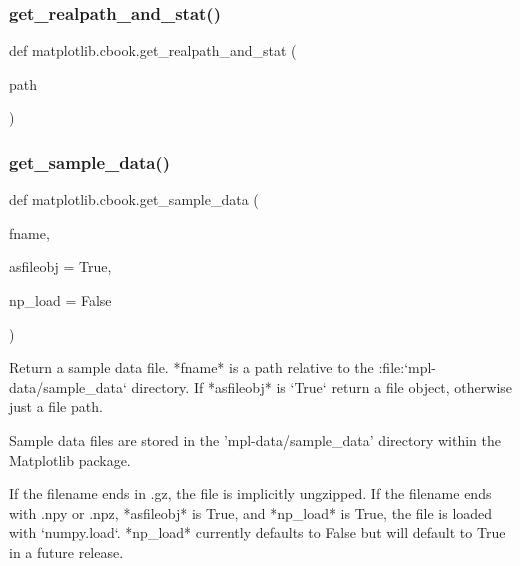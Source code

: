 \subsubsection{\texorpdfstring{get\+\_\+realpath\+\_\+and\+\_\+stat()}{get\_realpath\_and\_stat()}}
{\footnotesize\ttfamily def matplotlib.\+cbook.\+get\+\_\+realpath\+\_\+and\+\_\+stat (\begin{DoxyParamCaption}\item[{}]{path }\end{DoxyParamCaption})}

\mbox{\label{namespacematplotlib_1_1cbook_a846b3b7e13d95cc8f596a8bbe7b62029}} 
\subsubsection{\texorpdfstring{get\+\_\+sample\+\_\+data()}{get\_sample\_data()}}
{\footnotesize\ttfamily def matplotlib.\+cbook.\+get\+\_\+sample\+\_\+data (\begin{DoxyParamCaption}\item[{}]{fname,  }\item[{}]{asfileobj = {\ttfamily True},  }\item[{}]{np\+\_\+load = {\ttfamily False} }\end{DoxyParamCaption})}

\begin{DoxyVerb}Return a sample data file.  *fname* is a path relative to the
:file:`mpl-data/sample_data` directory.  If *asfileobj* is `True`
return a file object, otherwise just a file path.

Sample data files are stored in the 'mpl-data/sample_data' directory within
the Matplotlib package.

If the filename ends in .gz, the file is implicitly ungzipped.  If the
filename ends with .npy or .npz, *asfileobj* is True, and *np_load* is
True, the file is loaded with `numpy.load`.  *np_load* currently defaults
to False but will default to True in a future release.
\end{DoxyVerb}
 \mbox{\label{namespacematplotlib_1_1cbook_a7ae5af68c98ed9f012d32478c0666b41}} 
